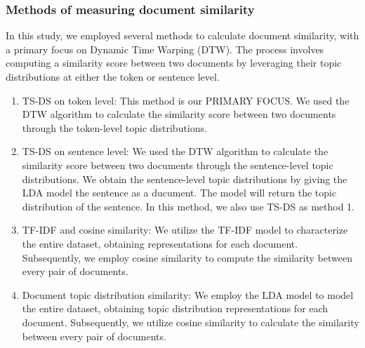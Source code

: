 \documentclass[UTF8]{ctexart}
\begin{document}
\subsubsection{Methods of measuring document similarity}
{
    In this study, we employed several methods to calculate document similarity, with a primary focus on Dynamic Time Warping (DTW). 
    The process involves computing a similarity score between two documents by 
    leveraging their topic distributions at either the token or sentence level.
    \begin{enumerate}
        \item {TS-DS on token level:}{
            This method is our PRIMARY FOCUS. 
            We used the DTW algorithm to calculate the similarity score between two documents through 
            the token-level topic distributions. 
        }
        \item {TS-DS on sentence level:}{  
            We used the DTW algorithm to calculate the similarity score between two documents through 
            the sentence-level topic distributions.
            We obtain the sentence-level topic distributions by giving the LDA model the sentence as a
            ducument. The model will return the topic distribution of the sentence.
            In this method, we also use TS-DS as method 1.
        }
        \item {TF-IDF and cosine similarity:}{
            We utilize the TF-IDF model to characterize the entire dataset, 
            obtaining representations for each document. 
            Subsequently, we employ cosine similarity to compute the similarity between every pair of documents.
        }
        \item {Document topic distribution similarity:}{
            We employ the LDA model to model the entire dataset, 
            obtaining topic distribution representations for each document. 
            Subsequently, we utilize cosine similarity to calculate the similarity between every pair of documents.
        }
    \end{enumerate}
}
\end{document}
